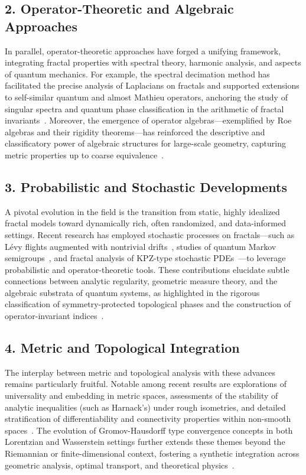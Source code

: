 \documentclass[sigconf]{acmart}
\begin{document}
\subsection*{2. Operator-Theoretic and Algebraic Approaches}

In parallel, operator-theoretic approaches have forged a unifying framework, integrating fractal properties with spectral theory, harmonic analysis, and aspects of quantum mechanics. For example, the spectral decimation method has facilitated the precise analysis of Laplacians on fractals and supported extensions to self-similar quantum and almost Mathieu operators, anchoring the study of singular spectra and quantum phase classification in the arithmetic of fractal invariants~\cite{ref69,ref70,ref34}. Moreover, the emergence of operator algebras---exemplified by Roe algebras and their rigidity theorems---has reinforced the descriptive and classificatory power of algebraic structures for large-scale geometry, capturing metric properties up to coarse equivalence~\cite{ref52,ref80}.

\subsection*{3. Probabilistic and Stochastic Developments}

A pivotal evolution in the field is the transition from static, highly idealized fractal models toward dynamically rich, often randomized, and data-informed settings. Recent research has employed stochastic processes on fractals---such as Lévy flights augmented with nontrivial drifts~\cite{ref4}, studies of quantum Markov semigroups~\cite{ref90}, and fractal analysis of KPZ-type stochastic PDEs~\cite{ref95}---to leverage probabilistic and operator-theoretic tools. These contributions elucidate subtle connections between analytic regularity, geometric measure theory, and the algebraic substrata of quantum systems, as highlighted in the rigorous classification of symmetry-protected topological phases and the construction of operator-invariant indices~\cite{ref66,ref67,ref68}.

\subsection*{4. Metric and Topological Integration}

The interplay between metric and topological analysis with these advances remains particularly fruitful. Notable among recent results are explorations of universality and embedding in metric spaces, assessments of the stability of analytic inequalities (such as Harnack's) under rough isometries, and detailed stratification of differentiability and connectivity properties within non-smooth spaces~\cite{ref50,ref53,ref54,ref81}. The evolution of Gromov-Hausdorff type convergence concepts in both Lorentzian and Wasserstein settings further extends these themes beyond the Riemannian or finite-dimensional context, fostering a synthetic integration across geometric analysis, optimal transport, and theoretical physics~\cite{ref78,ref107,ref108}.
\end{document}

